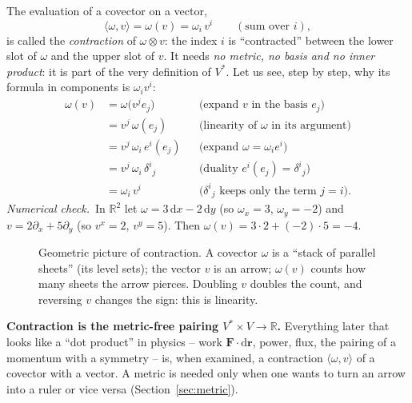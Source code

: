 \documentclass[11pt,a4paper]{article}
\numberwithin{equation}{section}
\theoremstyle{definition}
\theoremstyle{plain}
\newcommand{\numcheck}{\textit{Numerical check.}\ }
\newcommand{\R}{\mathbb{R}}
\newcommand{\dd}{\mathrm{d}}
\begin{document}
The evaluation of a covector on a vector,
\begin{equation}\label{eq:pairing}
\langle\omega,v\rangle=\omega(v)=\omega_i\,v^i\qquad(\text{sum over }i),
\end{equation}
is called the \emph{contraction} of $\omega\otimes v$: the index $i$ is ``contracted'' between the lower slot of $\omega$ and the
upper slot of $v$. It needs \emph{no metric, no basis and no inner product}: it is part of the very definition of $V^*$.
Let us see, step by step, why its formula in components is $\omega_iv^i$:
\begin{align*}
\omega(v)&=\omega\bigl(v^je_j\bigr) &&\text{(expand $v$ in the basis $e_j$)}\\
&=v^j\,\omega(e_j) &&\text{(linearity of $\omega$ in its argument)}\\
&=v^j\,\omega_i\,e^i(e_j) &&\text{(expand $\omega=\omega_ie^i$)}\\
&=v^j\,\omega_i\,\delta^i{}_j &&\text{(duality $e^i(e_j)=\delta^i{}_j$)}\\
&=\omega_i\,v^i &&\text{($\delta^i{}_j$ keeps only the term $j=i$).}
\end{align*}
\numcheck In $\R^2$ let $\omega=3\,\dd x-2\,\dd y$ (so $\omega_x=3$, $\omega_y=-2$) and $v=2\partial_x+5\partial_y$
(so $v^x=2$, $v^y=5$). Then $\omega(v)=3\cdot2+(-2)\cdot5=-4$.

\begin{figure}[ht]
\centering
{}
\caption{Geometric picture of contraction. A covector $\omega$ is a ``stack of parallel sheets'' (its level sets); the vector
$v$ is an arrow; $\omega(v)$ counts how many sheets the arrow pierces. Doubling $v$ doubles the count, and reversing $v$
changes the sign: this is linearity.}
\label{fig:sheets}
\end{figure}

\begin{keyidea}
\textbf{Contraction is the metric-free pairing $V^*\times V\to\R$.} Everything later that looks like a ``dot product'' in physics
-- work $\mathbf F\cdot\dd\mathbf r$, power, flux, the pairing of a momentum with a symmetry -- is, when examined, a contraction
$\langle\omega,v\rangle$ of a covector with a vector. A metric is needed only when one wants to turn an arrow into a ruler or
vice versa (Section~\ref{sec:metric}).
\end{keyidea}
\end{document}
